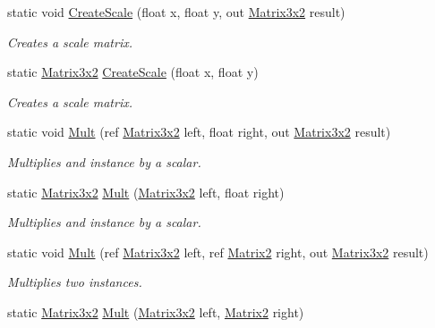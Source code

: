 \begin{DoxyCompactItemize}
static void \hyperlink{struct_open_t_k_1_1_matrix3x2_a0f99ca4676ac867f9e8c013970468508}{Create\-Scale} (float x, float y, out \hyperlink{struct_open_t_k_1_1_matrix3x2}{Matrix3x2} result)
\begin{DoxyCompactList}\small\item\em Creates a scale matrix. \end{DoxyCompactList}\item 
static \hyperlink{struct_open_t_k_1_1_matrix3x2}{Matrix3x2} \hyperlink{struct_open_t_k_1_1_matrix3x2_acea91d34ca7ab5555ffec1d6d7da524a}{Create\-Scale} (float x, float y)
\begin{DoxyCompactList}\small\item\em Creates a scale matrix. \end{DoxyCompactList}\item 
static void \hyperlink{struct_open_t_k_1_1_matrix3x2_ae5c7406e818035b4b1ff1f2d771afb04}{Mult} (ref \hyperlink{struct_open_t_k_1_1_matrix3x2}{Matrix3x2} left, float right, out \hyperlink{struct_open_t_k_1_1_matrix3x2}{Matrix3x2} result)
\begin{DoxyCompactList}\small\item\em Multiplies and instance by a scalar. \end{DoxyCompactList}\item 
static \hyperlink{struct_open_t_k_1_1_matrix3x2}{Matrix3x2} \hyperlink{struct_open_t_k_1_1_matrix3x2_a40154077df60fd76fd44598ed5985c86}{Mult} (\hyperlink{struct_open_t_k_1_1_matrix3x2}{Matrix3x2} left, float right)
\begin{DoxyCompactList}\small\item\em Multiplies and instance by a scalar. \end{DoxyCompactList}\item 
static void \hyperlink{struct_open_t_k_1_1_matrix3x2_a8551ef6f1aa953f1747e3e4311c39f0b}{Mult} (ref \hyperlink{struct_open_t_k_1_1_matrix3x2}{Matrix3x2} left, ref \hyperlink{struct_open_t_k_1_1_matrix2}{Matrix2} right, out \hyperlink{struct_open_t_k_1_1_matrix3x2}{Matrix3x2} result)
\begin{DoxyCompactList}\small\item\em Multiplies two instances. \end{DoxyCompactList}\item 
static \hyperlink{struct_open_t_k_1_1_matrix3x2}{Matrix3x2} \hyperlink{struct_open_t_k_1_1_matrix3x2_ad869f8274c43e058d29995d11e0d6a6c}{Mult} (\hyperlink{struct_open_t_k_1_1_matrix3x2}{Matrix3x2} left, \hyperlink{struct_open_t_k_1_1_matrix2}{Matrix2} right)

\end{DoxyCompactItemize}
